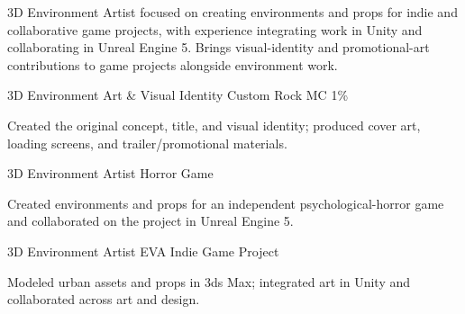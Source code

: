 \documentclass[11pt,a4paper]{../Awesome-CV/awesome-cv}
\begin{document}
\makecvheader

3D Environment Artist focused on creating environments and props for indie and collaborative game projects, with experience integrating work in Unity and collaborating in Unreal Engine 5. Brings visual-identity and promotional-art contributions to game projects alongside environment work.

\begin{cventries}
  \cventry
    {3D Environment Art \& Visual Identity}
    {Custom Rock MC 1\%}
    {}
    {}
    {
      \begin{cvitems}
        \item {Created the original concept, title, and visual identity; produced cover art, loading screens, and trailer/promotional materials.}
      \end{cvitems}
    }
  \cventry
    {3D Environment Artist}
    {Horror Game}
    {}
    {}
    {
      \begin{cvitems}
        \item {Created environments and props for an independent psychological-horror game and collaborated on the project in Unreal Engine 5.}
      \end{cvitems}
    }
  \cventry
    {3D Environment Artist}
    {EVA Indie Game Project}
    {}
    {}
    {
      \begin{cvitems}
        \item {Modeled urban assets and props in 3ds Max; integrated art in Unity and collaborated across art and design.}
      \end{cvitems}
    }
\end{cventries}

\begin{cvskills}
\end{cvskills}


\end{document}
